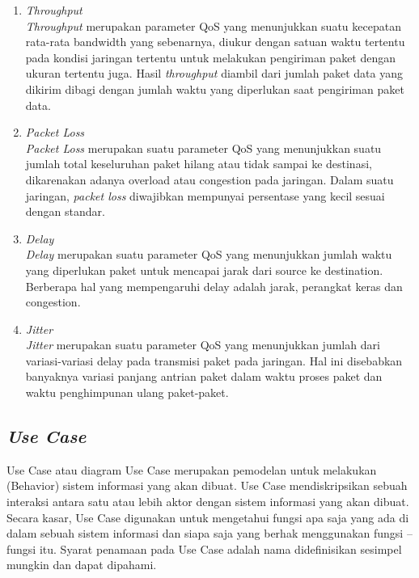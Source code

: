 \begin{sloppypar}
\begin{enumerate}
	\item \textit{\textit{Throughput}} \\
	\textit{Throughput} merupakan parameter QoS yang 
menunjukkan suatu kecepatan rata-rata bandwidth
yang sebenarnya, diukur dengan satuan waktu 
tertentu pada kondisi jaringan tertentu untuk 
melakukan pengiriman paket dengan ukuran tertentu 
juga. Hasil \textit{throughput} diambil dari jumlah paket 
data yang dikirim dibagi dengan jumlah waktu yang 
diperlukan saat pengiriman paket data.
	\item \textit{Packet Loss} \\
	\textit{Packet Loss} merupakan suatu parameter QoS 
yang menunjukkan suatu jumlah total keseluruhan 
paket hilang atau tidak sampai ke destinasi, 
dikarenakan adanya overload atau congestion pada 
jaringan. Dalam suatu jaringan, \textit{packet loss}
diwajibkan mempunyai persentase yang kecil sesuai 
dengan standar. 
\item \textit{Delay} \\
\textit{Delay} merupakan suatu parameter QoS yang 
menunjukkan jumlah waktu yang diperlukan paket 
untuk mencapai jarak dari source ke destination. 
Berberapa hal yang mempengaruhi delay adalah 
jarak, perangkat keras dan congestion. 
\item \textit{Jitter}\\
\textit{Jitter} merupakan suatu parameter QoS yang 
menunjukkan jumlah dari variasi-variasi delay pada 
transmisi paket pada jaringan. Hal ini disebabkan 
banyaknya variasi panjang antrian paket dalam 
waktu proses paket dan waktu penghimpunan ulang 
paket-paket.

\end{enumerate}

\subsection{\textit{Use Case}}
\noindent

Use Case atau diagram Use Case merupakan 
pemodelan untuk melakukan (Behavior) sistem 
informasi yang akan dibuat. Use Case
mendiskripsikan sebuah interaksi antara satu 
atau lebih aktor dengan sistem informasi yang 
akan dibuat. Secara kasar, Use Case digunakan 
untuk mengetahui fungsi apa saja yang ada di 
dalam sebuah sistem informasi dan siapa saja 
yang berhak menggunakan fungsi – fungsi itu. 
Syarat penamaan pada Use Case adalah nama 
didefinisikan sesimpel mungkin dan dapat 
dipahami\parencite{mandiri2013pembuatan}. 


\end{sloppypar}
